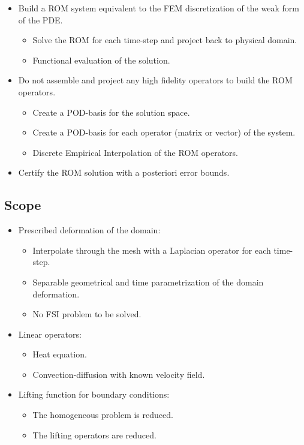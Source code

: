 \documentclass[../main.tex]{subfiles}
\begin{document}
\begin{itemize}
    \item Build a ROM system equivalent to the FEM discretization of the weak form of the PDE.
    \begin{itemize}
        \item Solve the ROM for each time-step and project back to physical domain.
        \item Functional evaluation of the solution.
    \end{itemize}
    \item Do not assemble and project any high fidelity operators to build the ROM operators.
    \begin{itemize}
        \item Create a POD-basis for the solution space.
        \item Create a POD-basis for each operator (matrix or vector) of the system.
        \item Discrete Empirical Interpolation of the ROM operators.
    \end{itemize}
    \item Certify the ROM solution with a posteriori error bounds.
\end{itemize}

\subsection{Scope}
\begin{itemize}
    \item Prescribed deformation of the domain:
    \begin{itemize}
        \item Interpolate through the mesh with a Laplacian operator for each time-step.
        \item Separable geometrical and time parametrization of the domain deformation.
        \item No FSI problem to be solved.
    \end{itemize}
    \item Linear operators:
    \begin{itemize}
        \item Heat equation.
        \item Convection-diffusion with known velocity field. 
    \end{itemize}
    \item Lifting function for boundary conditions:
    \begin{itemize}
        \item The homogeneous problem is reduced.
        \item The lifting operators are reduced. 
    \end{itemize}
\end{itemize}
\end{document}
